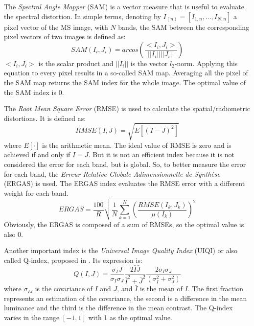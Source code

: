 \documentclass[12pt]{report}
\begin{document}
The \textit{Spectral Angle Mapper }(SAM) is a vector measure that is useful to evaluate the spectral distortion.
In simple terms, denoting by $I_{(n)} = [I_{1,{n}}, \dots , I_{N,{n}}]$ a pixel vector of the MS image, with $N$ bands,
the SAM between the corresponding pixel vectors of two images is defined as:
%
\begin{equation}
    SAM(I_i, J_i) = arcos\left(\frac{<I_i, J_i>}{||I_i|| || J_i||}\right)
    \label{sam}
\end{equation}
%
$<I_i, J_i>$ is the scalar product and $||I_i||$ is the vector $l_2$-norm. 
Applying this equation to every pixel results in a so-called SAM map.
Averaging all the pixel of the SAM map returns the SAM index for the whole image.
The optimal value of the SAM index is 0.

The \textit{Root Mean Square Error} (RMSE) is used to calculate the spatial/radiometric distortions.
It is defined as:
%
\begin{equation}
    RMSE(I,J) = \sqrt{E[(I-J)^2]}
    \label{rmse}
\end{equation}
%
where $E[\cdot]$ is the arithmetic mean.
The ideal value of RMSE is zero and is achieved if and only if $I = J$.
But it is not an efficient index because it is not considered the error for each band, but is global.
So, to better measure the error for each band, the \textit{Erreur Relative Globale
Adimensionnelle de Synthèse} (ERGAS) is used. 
The ERGAS index evaluates the RMSE error with a different weight for each band.
%
\begin{equation}
    ERGAS = \frac{100}{R} \sqrt{\frac{1}{N} \sum_{k=1}^N\left(\frac{RMSE(I_k, J_k)}{\mu(I_k)}\right)^2}
    \label{ergas}
\end{equation}
%
Obviously, the ERGAS is composed of a sum of RMSEs, so the optimal value is also 0.

Another important index is the \textit{Universal Image Quality Index} (UIQI) or also called Q-index, proposed in \cite{uiqi}.
Its expression is:
%
\begin{equation}
    Q(I,J) = \frac{\sigma_IJ}{\sigma_I \sigma_J} \frac{2 \bar{I}\bar{J}}{\bar{I}^2 + \bar{J}^2} 
    \frac{2 \sigma_I \sigma_J}{(\sigma_I^2 + \sigma_J^2)}
    \label{q}
\end{equation}
%
where $\sigma_{IJ}$ is the covariance of $I$ and $J$, and $\bar{I}$ is the mean of $I$.
The first fraction represents an estimation of the covariance, the second is a difference in the mean luminance
and the third is the difference in the mean contrast.
The Q-index varies in the range $[-1, 1]$ with 1 as the optimal value.
\end{document}
